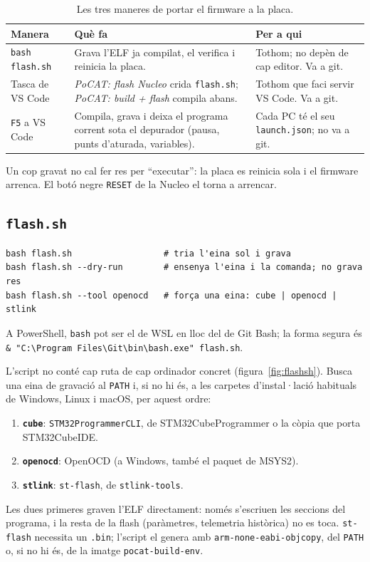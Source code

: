 \documentclass[11pt,a4paper]{article}
\DeclareRobustCommand{\_}{\textunderscore\allowbreak}
\newcommand{\cd}[1]{\texttt{#1}}
\begin{document}
\begin{table}[H]
\centering\small
\begin{tabularx}{\textwidth}{@{}>{\raggedright\arraybackslash}p{3.6cm}>{\raggedright\arraybackslash}X>{\raggedright\arraybackslash}p{4.4cm}@{}}
\toprule
Manera & Què fa & Per a qui\\
\midrule
\cd{bash flash.sh} & Grava l'ELF ja compilat, el verifica i reinicia la placa. & Tothom; no depèn de cap editor. Va a git.\\
Tasca de VS Code & \emph{PoCAT: flash Nucleo} crida \cd{flash.sh}; \emph{PoCAT: build + flash} compila abans. & Tothom que faci servir VS Code. Va a git.\\
\cd{F5} a VS Code & Compila, grava i deixa el programa corrent sota el depurador (pausa, punts d'aturada, variables). & Cada PC té el seu \cd{launch.json}; no va a git.\\
\bottomrule
\end{tabularx}
\caption{Les tres maneres de portar el firmware a la placa.}
\end{table}

Un cop gravat no cal fer res per ``executar'': la placa es reinicia sola i el firmware
arrenca. El botó negre \cd{RESET} de la Nucleo el torna a arrencar.

\subsection{\texorpdfstring{\cd{flash.sh}}{flash.sh}}

\begin{lstlisting}
bash flash.sh                  # tria l'eina sol i grava
bash flash.sh --dry-run        # ensenya l'eina i la comanda; no grava res
bash flash.sh --tool openocd   # força una eina: cube | openocd | stlink
\end{lstlisting}
A PowerShell, \cd{bash} pot ser el de WSL en lloc del de Git Bash; la forma segura és
\cd{\& "C:\textbackslash Program Files\textbackslash Git\textbackslash bin\textbackslash bash.exe" flash.sh}.

L'script no conté cap ruta de cap ordinador concret (figura~\ref{fig:flashsh}). Busca una
eina de gravació al \cd{PATH} i, si no hi és, a les carpetes d'instal·lació habituals de
Windows, Linux i macOS, per aquest ordre:
\begin{enumerate}
\item \textbf{\cd{cube}}: \cd{STM32\_Programmer\_CLI}, de STM32CubeProgrammer o la còpia que porta STM32CubeIDE.
\item \textbf{\cd{openocd}}: OpenOCD (a Windows, també el paquet de MSYS2).
\item \textbf{\cd{stlink}}: \cd{st-flash}, de \cd{stlink-tools}.
\end{enumerate}
Les dues primeres graven l'ELF directament: només s'escriuen les seccions del programa, i
la resta de la flash (paràmetres, telemetria històrica) no es toca. \cd{st-flash} necessita
un \cd{.bin}; l'script el genera amb \cd{arm-none-eabi-objcopy}, del \cd{PATH} o, si no hi
és, de la imatge \cd{pocat-build-env}.
\end{document}
